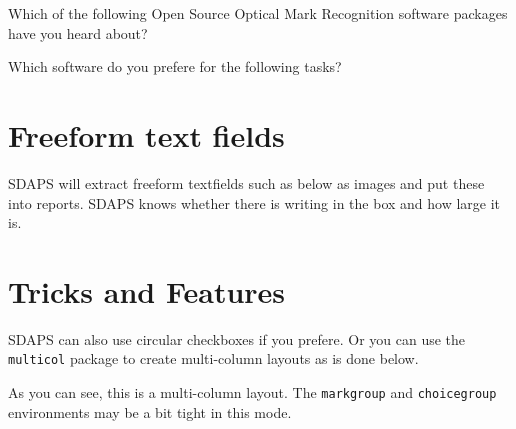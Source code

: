 \documentclass[
  english,
  pagemark,
  stamp]{sdaps}
\begin{document}
\begin{questionnaire}
\begin{choicequestion}[3]{Which of the following Open Source
                              Optical Mark Recognition software
                              packages have you heard about?}
    \end{choicequestion}

    \begin{choicegroup}{Which software do you prefere for the following tasks?}
      \groupaddchoice{\LaTeX}

    \end{choicegroup}

    \section{Freeform text fields}

    SDAPS will extract freeform textfields such as below as images and put
    these into reports. SDAPS knows whether there is writing in the box and
    how large it is.


    \newpage
    \section{Tricks and Features}
    SDAPS can also use circular checkboxes if you prefere. Or you can use the
    {\tt multicol} package to create multi-column layouts as is done below.

    \def\checkboxstyle{ellipse}

    \begin{multicols}{2}
      \label{somelabel}

      As you can see, this is a multi-column layout. The {\tt markgroup} and
      {\tt choicegroup} environments may be a bit tight in this mode.


\end{multicols}
\end{questionnaire}
\end{document}
